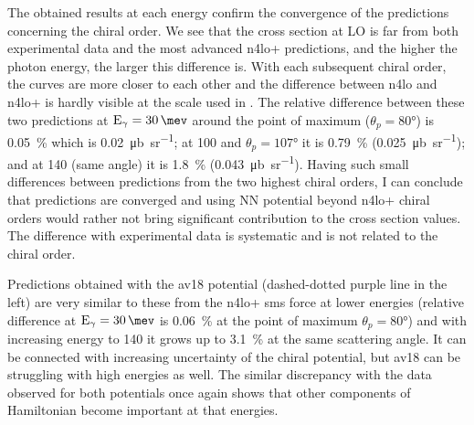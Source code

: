    The obtained results at each energy confirm the convergence 
    of the predictions concerning the chiral order.
    We see that the cross section at LO is far from both experimental 
    data and the most advanced \gls{n4lo+} predictions, and
    the higher the photon energy, the larger this
    difference is. With each subsequent chiral order, the 
    curves are more closer to each other and the difference
    between \gls{n4lo} and \gls{n4lo+} is hardly visible at the scale used in .
    The relative difference between these two predictions at $\text{E}_\gamma=\SI{30}{\mev}$ around the point of maximum 
    ($\theta_p = \ang{80}$) is \SI{0.05}{\percent} which is \SI{0.02}{\micro \barn \per \steradian};
    at \SI{100}{\mev} and $\theta_p = \ang{107}$ it is \SI{0.79}{\percent} (\SI{0.025}{\micro \barn \per \steradian});
    and at \SI{140}{\mev} (same angle) it is \SI{1.8}{\percent} (\SI{0.043}{\micro \barn \per \steradian}).
    Having such small differences between predictions from the two highest chiral orders,
    I can conclude that predictions are converged and 
    using NN potential beyond \gls{n4lo+} chiral orders would rather not bring significant contribution 
    to the cross section values. 
    The difference with experimental data is systematic 
    and is not related to the chiral order. 
    

    Predictions obtained with the \gls{av18} potential 
    (dashed-dotted purple line in the  left)
    are very similar to these from the \gls{n4lo+} \gls{sms} force at lower energies
    (relative difference at $\text{E}_\gamma=\SI{30}{\mev}$ is \SI{0.06}{\percent}
    at the point of maximum $\theta_p = \ang{80}$) and with increasing energy to \SI{140}{\mev}
    it grows up to \SI{3.1}{\percent} at the same scattering angle. 
    It can be connected with 
    increasing uncertainty of the chiral potential,
    but \gls{av18} can
    be struggling with high energies as well.
    The similar discrepancy with the data observed for both potentials
    once again shows that other 
    components of Hamiltonian become important at that energies.

